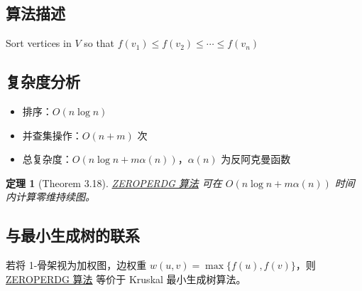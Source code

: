 \documentclass[UTF8]{ctexart}
\newtheorem{theorem}[definition]{定理}
\begin{document}
\subsection{算法描述}

\begin{algorithm}[htbp]
\caption{ZEROPERDG}
\label{alg:zeroperdg}
Sort vertices in $V$ so that $f(v_1) \le f(v_2) \le \cdots \le f(v_n)$\;
\end{algorithm}

\subsection{复杂度分析}

\begin{itemize}
    \item 排序：\(O(n \log n)\)
    \item 并查集操作：\(O(n + m)\) 次
    \item 总复杂度：\(O(n \log n + m \alpha(n))\)，\(\alpha(n)\) 为反阿克曼函数
\end{itemize}

\begin{theorem}[Theorem 3.18]
\hyperref[alg:zeroperdg]{ZEROPERDG 算法} 可在 \(O(n \log n + m \alpha(n))\) 时间内计算零维持续图。
\end{theorem}

\subsection{与最小生成树的联系}

若将 1-骨架视为加权图，边权重 \(w(u, v) = \max\{f(u), f(v)\}\)，则 \hyperref[alg:zeroperdg]{ZEROPERDG 算法} 等价于 Kruskal 最小生成树算法。
\end{document}
